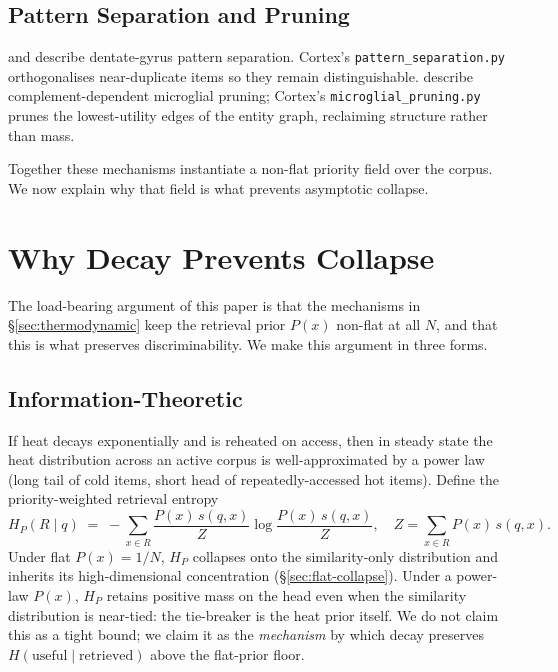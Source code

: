 \documentclass[11pt]{article}
\begin{document}
\subsection{Pattern Separation and Pruning}
\label{sec:separation}

\citet{Leutgeb2007} and \citet{Yassa2011} describe dentate-gyrus
pattern separation.  Cortex's \texttt{pattern\_separation.py}
orthogonalises near-duplicate items so they remain distinguishable.
\citet{Wang2020} describe complement-dependent microglial pruning;
Cortex's \texttt{microglial\_pruning.py} prunes the lowest-utility
edges of the entity graph, reclaiming structure rather than mass.

Together these mechanisms instantiate a non-flat priority field over
the corpus.  We now explain why that field is what prevents
asymptotic collapse.

\section{Why Decay Prevents Collapse}
\label{sec:why-decay}

The load-bearing argument of this paper is that the mechanisms in
\S\ref{sec:thermodynamic} keep the retrieval prior $P(x)$ non-flat
at all $N$, and that this is what preserves discriminability.  We
make this argument in three forms.

\subsection{Information-Theoretic}
\label{sec:info-theory}

If heat decays exponentially and is reheated on access, then in
steady state the heat distribution across an active corpus is
well-approximated by a power law (long tail of cold items, short
head of repeatedly-accessed hot items).  Define the
priority-weighted retrieval entropy
\begin{equation}
H_P(R \mid q) \;=\; -\sum_{x \in R}
\frac{P(x)\, s(q, x)}{Z}
\log \frac{P(x)\, s(q, x)}{Z},
\quad Z = \sum_{x \in R} P(x)\, s(q, x).
\label{eq:HP}
\end{equation}
Under flat $P(x) = 1/N$, $H_P$ collapses onto the similarity-only
distribution and inherits its high-dimensional concentration
(\S\ref{sec:flat-collapse}).  Under a power-law $P(x)$, $H_P$
retains positive mass on the head even when the similarity
distribution is near-tied: the tie-breaker is the heat prior itself.
We do not claim this as a tight bound; we claim it as the
\emph{mechanism} by which decay preserves
$H(\mathrm{useful} \mid \mathrm{retrieved})$ above the flat-prior
floor.
\end{document}
